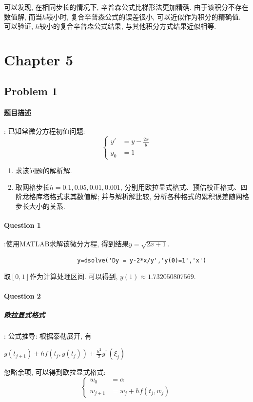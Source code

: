 \documentclass{article}
\begin{document}
\begin{CJK*}{UTF8}{song}
				可以发现, 在相同步长的情况下, 辛普森公式比梯形法更加精确. 由于该积分不存在数值解, 而当$h$较小时, 复合辛普森公式的误差很小, 可以近似作为积分的精确值. 可以验证, $h$较小的复合辛普森公式结果, 与其他积分方式结果近似相等.
	\section{Chapter 5}
		\subsection{Problem 1}
			\paragraph{题目描述}
			:\newline
				已知常微分方程初值问题:
				$$\left\{ 
					\begin{aligned}
						y'  & = y - \frac{2x}{y} \\
						y_0 & = 1
					\end{aligned}
				\right.$$
				\begin{enumerate}
					\item 求该问题的解析解.
					\item 取网格步长$h = 0.1,0.05,0.01,0.001$, 分别用欧拉显式格式、预估校正格式、四阶龙格库塔格式求其数值解; 并与解析解比较, 分析各种格式的累积误差随网格步长大小的关系.
				\end{enumerate}
			\paragraph{Question 1}
				:使用MATLAB求解该微分方程, 得到结果$y = \sqrt{2x+1}$.
				\begin{lstlisting}
					 y=dsolve('Dy = y-2*x/y','y(0)=1','x')
				\end{lstlisting}
				取$\left[0,1\right]$作为计算处理区间. 可以得到, $y\left(1\right) \approx 1.732050807569$.
			\paragraph{Question 2}
				\subparagraph{欧拉显式格式}:\newline
					公式推导:
					根据泰勒展开, 有
					
					$y\left(t_{j+1}\right) + hf\left(t_j,y\left(t_j\right)\right) + \frac{h^2}{2}y^{''}\left(\xi_j\right)$
					
					忽略余项, 可以得到欧拉显式格式:
					$$\left\{
						\begin{aligned}
							w_0 &= \alpha \\
							w_{j+1} &= w_j + hf\left(t_j,w_j\right)
						\end{aligned}
					\right.$$
					

\end{CJK*}
\end{document}
